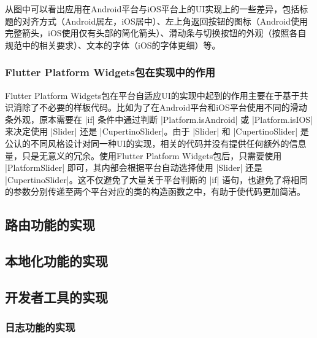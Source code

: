 从图中可以看出应用在Android平台与iOS平台上的UI实现上的一些差异，包括标题的对齐方式（Android居左，iOS居中）、左上角返回按钮的图标（Android使用完整箭头，iOS使用仅有头部的简化箭头）、滑动条与切换按钮的外观（按照各自规范中的相关要求）、文本的字体（iOS的字体更细）等。

\subsubsection{Flutter Platform Widgets包在实现中的作用}

Flutter Platform Widgets包在平台自适应UI的实现中起到的作用主要在于基于共识消除了不必要的样板代码。比如为了在Android平台和iOS平台使用不同的滑动条外观，原本需要在 |if| 条件中通过判断 |Platform.isAndroid| 或 |Platform.isIOS| 来决定使用 |Slider| 还是 |CupertinoSlider|。由于 |Slider| 和 |CupertinoSlider| 是公认的不同风格设计对同一种UI的实现，相关的代码并没有提供任何额外的信息量，只是无意义的冗余。使用Flutter Platform Widgets包后，只需要使用 |PlatformSlider| 即可，其内部会根据平台自动选择使用 |Slider| 还是 |CupertinoSlider|。这不仅避免了大量关于平台判断的 |if| 语句，也避免了将相同的参数分别传递至两个平台对应的类的构造函数之中，有助于使代码更加简洁。

\subsection{路由功能的实现}\label{subsec:router}


\subsection{本地化功能的实现}\label{subsec:l10n}


\subsection{开发者工具的实现}\label{subsec:dev-tools}


\subsubsection{日志功能的实现}\label{subsubsec:log}

